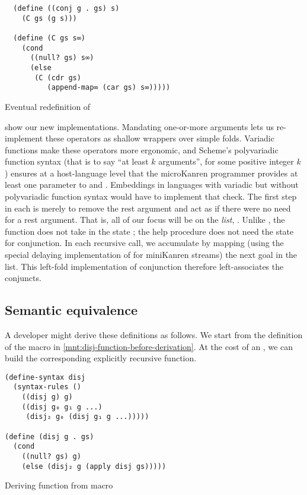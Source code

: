 \documentclass[sigplan,draft,balance,pbalance,natbib=false]{acmart}
\begin{document}
\begin{listing}
  \begin{verbatim}
  (define ((conj g . gs) s)
    (C gs (g s)))

  (define (C gs s∞)
    (cond
      ((null? gs) s∞)
      (else
       (C (cdr gs)
          (append-map∞ (car gs) s∞)))))
  \end{verbatim}
  \caption{Eventual redefinition of }
  \label{mnt:conj-reimplementation}
\end{listing}

 show our
new implementations. Mandating one-or-more arguments lets us
re-implement these operators as shallow wrappers over simple folds.
Variadic functions make these operators more ergonomic, and Scheme's
polyvariadic function syntax (that is to say \enquote{at least $k$
  arguments}, for some positive integer $k$) ensures at a
host-language level that the microKanren programmer provides at least
one parameter to  and . Embeddings
in languages with variadic but without polyvariadic function syntax
would have to implement that check. The first step in each is merely
to remove the rest argument  and act as if there were
no need for a rest argument. That is, all of our focus will be on the
\emph{list}, . Unlike , the
function  does not take in the state ; the
help procedure does not need the state for conjunction. In each
recursive call, we accumulate by mapping (using the special delaying
implementation of  for miniKanren streams) the
next goal in the list. This left-fold implementation of conjunction
therefore left-associates the conjuncts.

\subsection{Semantic equivalence}

A developer might derive these definitions as follows. We start from
the definition of the  macro in
\cref{mnt:disj-function-before-derivation}. At the cost of an
, we can build the corresponding explicitly
recursive  function.

\begin{listing}[h]
\begin{verbatim}
(define-syntax disj
  (syntax-rules ()
    ((disj g) g)
    ((disj g₀ g₁ g ...)
     (disj₂ g₀ (disj g₁ g ...)))))

(define (disj g . gs)
  (cond
    ((null? gs) g)
    (else (disj₂ g (apply disj gs)))))
\end{verbatim}
  \caption{Deriving  function from macro}
  \label{mnt:disj-function-before-derivation}
\end{listing}
\end{document}
